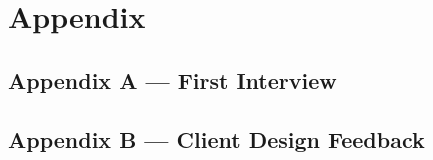 \documentclass[advisory-ia.tex]{subfiles}
\begin{document}
\section{Appendix}
\subsection{Appendix A --- First Interview}
\label{appendix:a}


\newpage
\subsection{Appendix B --- Client Design Feedback}
\label{appendix:b}

\lastpagelabel
\end{document}
